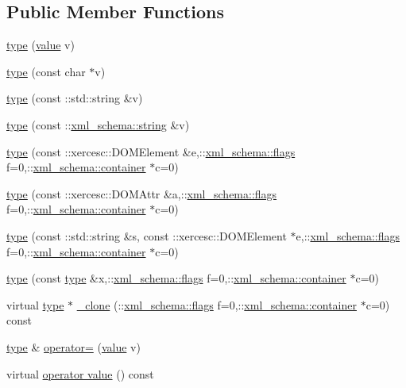 \subsection*{Public Member Functions}
\begin{DoxyCompactItemize}
\item 
\hyperlink{classtype_aed51d13ee609d224084c6cf0a9903f99}{type} (\hyperlink{classtype_a83781d700ce124b4224c316326a5a975}{value} v)
\item 
\hyperlink{classtype_aa5e87da016a56579ba0fc72de17517a5}{type} (const char $\ast$v)
\item 
\hyperlink{classtype_ae83bd8bffd0b7251dd664efe908511e7}{type} (const \+::std\+::string \&v)
\item 
\hyperlink{classtype_a9638b8e282f51d97c9e4e8d703e1f89c}{type} (const \+::\hyperlink{namespacexml__schema_ac0cec83a330f0024e4e318b3deac5104}{xml\+\_\+schema\+::string} \&v)
\item 
\hyperlink{classtype_aae224adcb4348cedbe90f4af5dcf1353}{type} (const \+::xercesc\+::\+D\+O\+M\+Element \&e,\+::\hyperlink{namespacexml__schema_a0612287d030cb2732d31a45b258fdc87}{xml\+\_\+schema\+::flags} f=0,\+::\hyperlink{namespacexml__schema_ada9aa30dc722e93ee2ed7243085402a5}{xml\+\_\+schema\+::container} $\ast$c=0)
\item 
\hyperlink{classtype_a7018bbc02d3c782aed64822b87dda220}{type} (const \+::xercesc\+::\+D\+O\+M\+Attr \&a,\+::\hyperlink{namespacexml__schema_a0612287d030cb2732d31a45b258fdc87}{xml\+\_\+schema\+::flags} f=0,\+::\hyperlink{namespacexml__schema_ada9aa30dc722e93ee2ed7243085402a5}{xml\+\_\+schema\+::container} $\ast$c=0)
\item 
\hyperlink{classtype_ac6751e8c63b52e22f73a1ab24d50a082}{type} (const \+::std\+::string \&s, const \+::xercesc\+::\+D\+O\+M\+Element $\ast$e,\+::\hyperlink{namespacexml__schema_a0612287d030cb2732d31a45b258fdc87}{xml\+\_\+schema\+::flags} f=0,\+::\hyperlink{namespacexml__schema_ada9aa30dc722e93ee2ed7243085402a5}{xml\+\_\+schema\+::container} $\ast$c=0)
\item 
\hyperlink{classtype_aa5eaba8747f76ddbccbb88f68e3311fe}{type} (const \hyperlink{classtype}{type} \&x,\+::\hyperlink{namespacexml__schema_a0612287d030cb2732d31a45b258fdc87}{xml\+\_\+schema\+::flags} f=0,\+::\hyperlink{namespacexml__schema_ada9aa30dc722e93ee2ed7243085402a5}{xml\+\_\+schema\+::container} $\ast$c=0)
\item 
virtual \hyperlink{classtype}{type} $\ast$ \hyperlink{classtype_afebbdc11bbf07de7ab79f148e9cd88b6}{\+\_\+clone} (\+::\hyperlink{namespacexml__schema_a0612287d030cb2732d31a45b258fdc87}{xml\+\_\+schema\+::flags} f=0,\+::\hyperlink{namespacexml__schema_ada9aa30dc722e93ee2ed7243085402a5}{xml\+\_\+schema\+::container} $\ast$c=0) const 
\item 
\hyperlink{classtype}{type} \& \hyperlink{classtype_af55f6d7e02cf92b839d842a58e2911ed}{operator=} (\hyperlink{classtype_a83781d700ce124b4224c316326a5a975}{value} v)
\item 
virtual \hyperlink{classtype_a5bfa60d90029d683cb4e46de45460246}{operator value} () const 
\end{DoxyCompactItemize}
